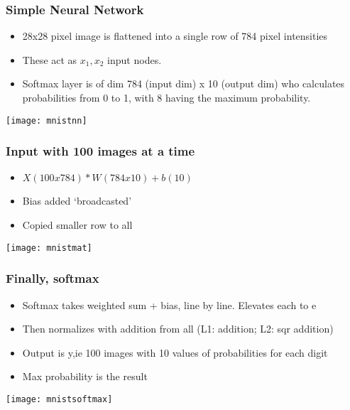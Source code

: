 \begin{frame}[fragile] \frametitle{Simple Neural Network}

\begin{itemize}
\item 28x28 pixel image is flattened into a single row of 784 pixel intensities
\item These act as $x_1,x_2$ input nodes. 
\item Softmax layer is of dim 784 (input dim) x 10 (output dim) who calculates probabilities from 0 to 1, with $8$ having the maximum probability.
\end{itemize}
\begin{center}
\texttt{[image: mnistnn]}
\end{center}
\end{frame}

\begin{frame}[fragile] \frametitle{Input with 100 images at a time}

\begin{itemize}
\item $X (100x784)*W(784x10) + b(10)$
\item Bias added `broadcasted'
\item Copied smaller row to all 
\end{itemize}
\begin{center}
\texttt{[image: mnistmat]}
\end{center}
\end{frame}

\begin{frame}[fragile] \frametitle{Finally, softmax}

\begin{itemize}
\item Softmax takes weighted sum + bias, line by line. Elevates each to e
\item Then normalizes with addition from all (L1: addition; L2: sqr addition)
\item Output is y,ie 100 images with 10 values of probabilities for each digit
\item Max probability is the result
\end{itemize}
\begin{center}
\texttt{[image: mnistsoftmax]}
\end{center}
\end{frame}


